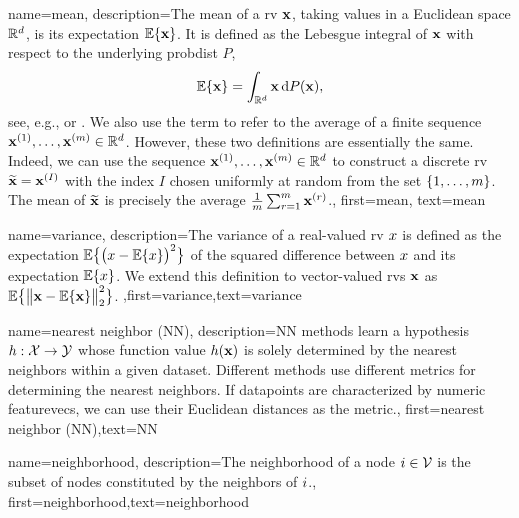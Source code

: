 {name={mean},
 description={The  mean of a \gls{rv} ${\bf x}$, taking 
 values in a Euclidean space $\mathbb{R}^{d}$, is its 
 \gls{expectation} $\mathbb{E}\{{\bf x}\}$. It is defined as the Lebesgue 
 integral of ${\bf x}$ with respect to the underlying \gls{probdist} $P$,
\[
\mathbb{E}\{{\bf x}\} = \int_{\mathbb{R}^{d}} {\bf x} \, \mathrm{d}P({\bf x}),
\]
see, e.g., \cite{BillingsleyProbMeasure} or \cite{RudinBookPrinciplesMatheAnalysis}. 
We also use the term to refer to the average of a finite sequence 
${\bf x}^{(1)}, \ldots, {\bf x}^{(m)} \in \mathbb{R}^{d}$. However, 
these two definitions are essentially the same. Indeed, we can use the sequence 
${\bf x}^{(1)}, \ldots, {\bf x}^{(m)} \in \mathbb{R}^{d}$ to construct a 
discrete \gls{rv} $\widetilde{{\bf x}}={\bf x}^{(I)}$ with the index $I$ chosen uniformly 
at random from the set $\{1,\ldots,m\}$. The mean of $\widetilde{{\bf x}}$ is 
precisely the average $\frac{1}{m} \sum_{r=1}^{m} {\bf x}^{(r)}$.},
first={mean}, text={mean}
}



{
	name={variance},
	description={The variance of a real-valued \gls{rv} $x$ is defined as the \gls{expectation} 
		$\mathbb{E}\big\{ \big( x - \mathbb{E}\{x \} \big)^{2} \big\}$ of the squared difference between $x$ 
		and its \gls{expectation} $\mathbb{E}\{x \}$. We extend this definition to vector-valued \gls{rv}s ${\bf x}$ 
		as $\mathbb{E}\big\{ \big\| {\bf x} - \mathbb{E}\{{\bf x} \} \big\|_{2}^{2} \big\}$.} ,first={variance},text={variance} 
}

{
	name={nearest neighbor (NN)},
	description={NN methods learn a \gls{hypothesis} 
		$h: \mathcal{X} \rightarrow \mathcal{Y}$ whose function value $h({\bf x})$ 
		is solely determined by the nearest \gls{neighbors} within a given \gls{dataset}. Different 
		methods use different metrics for determining the nearest \gls{neighbors}. If \gls{datapoint}s 
		are characterized by numeric \gls{featurevec}s, we can use their Euclidean distances as 
		the metric.},
	first={nearest neighbor (NN)},text={NN} 
}

{
	name={neighborhood},
	description={The neighborhood of a node $i \in \mathcal{V}$ is 
	the subset of nodes constituted by the \gls{neighbors} of $i$.},
	first={neighborhood},text={neighborhood} 
}


